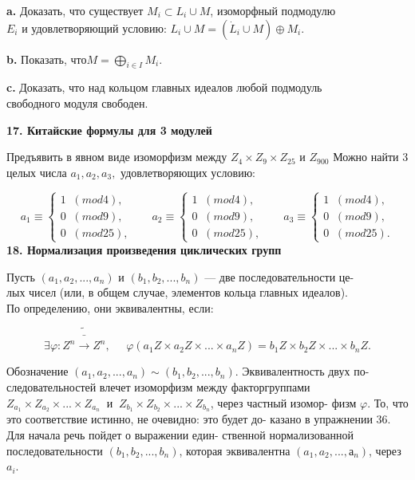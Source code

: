 \documentclass{../template/mai_book}
\begin{document}
{\bf a.} Доказать, что существует $M_i \subset L_i \cup M $, изоморфный подмодулю \\
$E_i$ и удовлетворяющий условию: $L_i \cup M = (\dot{L}_i \cup M)\oplus M_i$. 

\medskip

{\bf b.} Показать, что$M = \bigoplus_{i \in I}M_i$. 

\medskip

{\bf c.} Доказать, что над кольцом главных идеалов любой подмодуль \\
свободного модуля свободен. 

\medskip

{\noindent\bf 17. Китайские формулы для 3 модулей}

\medskip

Предъявить в явном виде изоморфизм между $ Z_4 \times Z_9 \times Z_25$ и $Z_{900}$ 
Можно найти 3 целых числа $a_1,a_2,a_3,$ удовлетворяющих условию: 

$$a_1 \equiv 
\begin{cases}
1\;\;(mod 4),  \\
0\;\;(mod 9),  \\
0\;\;(mod 25),  
\end{cases}
\;\;\;\;\;\;
a_2 \equiv 
\begin{cases}
1\;\;(mod 4),  \\
0\;\;(mod 9),  \\
0\;\;(mod 25),  
\end{cases}
\;\;\;\;\;\;
a_3 \equiv 
\begin{cases}
1\;\;(mod 4),  \\
0\;\;(mod 9),  \\
0\;\;(mod 25).  
\end{cases}
$$
\pagebreak
{\noindent\bf 18. Нормализация произведения циклических групп}

\medskip

Пусть $(a_1, a_2,..., a_n)$ и $(b_1, b_2,..., b_n)$ — две последовательности 
це-\\лых чисел (или, в общем случае, элементов кольца главных идеалов).\\ 
По определению, они эквивалентны, если:

$$\exists \varphi:Z^n\tilde{\bar{\rightarrow}} Z^n,\;\;\;\;\;\varphi(a_1Z\times a_2Z\times...\times a_nZ)=b_1Z\times b_2Z\times...\times b_nZ.$$

\noindent Обозначение $(a_1, a_2,..., a_n) \sim(b_1, b_2,..., b_n)$. Эквивалентность двух
по-\linebreak
следовательностей влечет изоморфизм между факторгруппами 
$ Z_{a_1}\times Z_{a_2}\times ...\times Z_{a_n}\;\;\text{и}\;\;Z_{b_1}\times Z_{b_2}\times ...\times Z_{b_n} $, через частный 
изомор-\linebreak
физм $\varphi$. То, что это соответствие истинно, не очевидно: это будет 
до-\linebreak
казано в упражнении 36. Для начала речь пойдет о выражении 
един-\linebreak
ственной нормализованной последовательности $(b_1, b_2,..., b_n)$, которая\linebreak
эквивалентна $(a_1, a_2,..., а_n)$, через $a_i$. 
\end{document}

